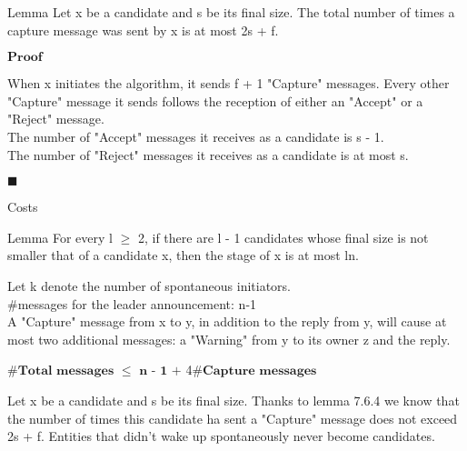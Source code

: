 \documentclass{beamer}
\begin{document}
\begin{frame}
\begin{block}{Lemma}
Let x be a candidate and s be its final size. The total number of times a capture message was sent by x is at most 2s + f.
\end{block}
\begin{flushleft}
$\textbf{Proof}$
\end{flushleft}
When x initiates the algorithm, it sends f + 1 "Capture" messages. Every other "Capture" message it sends follows the reception of either an "Accept" or a "Reject" message.\\ The number of "Accept" messages it receives as a candidate is s - 1.\\ The number of "Reject" messages it receives as a candidate is at most s.
\begin{flushright}
$\blacksquare$
\end{flushright}
\end{frame}

\begin{frame}{Costs}
\small
\begin{block}{Lemma}
For every l $\geqslant$ 2, if there are l - 1 candidates whose final size is not smaller that of a candidate x, then the stage of x is at most ln.
\end{block}
\small
Let k denote the number of spontaneous initiators.\\
$\#$messages for the leader announcement: n-1\\
A "Capture" message from x to y, in addition to the reply from y, will cause at most two additional messages: a "Warning" from y to its owner z and the reply.
\begin{center}
$\#\textbf{Total messages}$ $\leq$ $\textbf{n - 1 +}$ 4$\#\textbf{Capture messages}$
\end{center}
Let x be a candidate and s be its final size. Thanks to lemma 7.6.4 we know that the number of times this candidate ha sent a "Capture" message does not exceed 2s + f. Entities that didn't wake up spontaneously never become candidates.\\
\end{frame}
\end{document}

